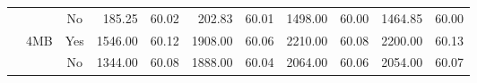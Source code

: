 \documentclass{article}
\begin{document}
\begin{table}[]
\begin{tabular}{@{}cccrrrrrrrr@{}}
                &                       & No                   &  185.25 & 60.02   &  202.83  & 60.01   & 1498.00 & 60.00   & 1464.85  & 60.00  \\
                                               
                & \multirow{2}{*}{4MB}  & Yes                  & 1546.00 & 60.12   & 1908.00  & 60.06   & 2210.00 & 60.08   & 2200.00  & 60.13  \\
                                               
                &                       & No                   & 1344.00 & 60.08   & 1888.00  & 60.04   & 2064.00 & 60.06   & 2054.00  & 60.07  \\
        \bottomrule
    \end{tabular}
\end{table}
\end{document}

